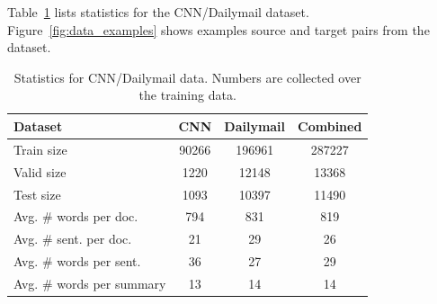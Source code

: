 \documentclass[12pt]{report}
\begin{document}
 Table~\ref{table:data_stats} lists statistics for the CNN/Dailymail dataset. Figure~\ref{fig:data_examples} shows examples source and target pairs from the dataset.



\begin{table}[h]
\centering
\begin{tabular}{lccc}
\toprule
Dataset  & CNN & Dailymail & Combined\\
\midrule
Train size & 90266 & 196961 & 287227\\
Valid size & 1220 & 12148 & 13368\\
Test size & 1093 & 10397 & 11490 \\
Avg. \# words per doc. & 794 & 831 & 819\\
Avg. \# sent. per doc. & 21 & 29 & 26\\
Avg. \# words per sent. & 36 & 27 & 29\\
Avg. \# words per summary & 13 & 14 & 14\\
\bottomrule
\end{tabular}
\caption[CNN/Dailymail Statistics]{Statistics for CNN/Dailymail data. Numbers are collected over the training data.}
\label{table:data_stats}
\end{table}
\end{document}
